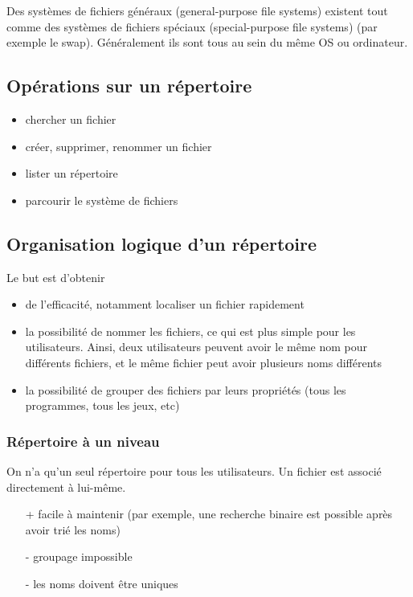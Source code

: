 	Des systèmes de fichiers généraux (general-purpose file systems) existent tout comme des systèmes de fichiers spéciaux (special-purpose file systems) (par exemple le swap). Généralement ils sont tous au sein du même OS ou ordinateur.
	
	
	\subsection{Opérations sur un répertoire}
	
	\begin{itemize}
		\item chercher un fichier
		\item créer, supprimer, renommer un fichier
		\item lister un répertoire
		\item parcourir le système de fichiers
	\end{itemize}
	
	\subsection{Organisation logique d'un répertoire}
	
	Le but est d'obtenir
	
	\begin{itemize}
		\item de l'efficacité, notamment localiser un fichier rapidement
		\item la possibilité de nommer les fichiers, ce qui est plus simple pour les utilisateurs. Ainsi, deux utilisateurs peuvent avoir le même nom pour différents fichiers, et le même fichier peut avoir plusieurs noms différents
		\item la possibilité de grouper des fichiers par leurs propriétés (tous les programmes, tous les jeux, etc)
	\end{itemize}
	
		\subsubsection{Répertoire à un niveau}
		
		On n'a qu'un seul répertoire pour tous les utilisateurs. Un fichier est associé directement à lui-même.
		
		
		\begin{itemize}
			\item[+] facile à maintenir (par exemple, une recherche binaire est possible après avoir trié les noms) 
			\item[-] groupage impossible
			\item[-] les noms doivent être uniques
		\end{itemize}
		
